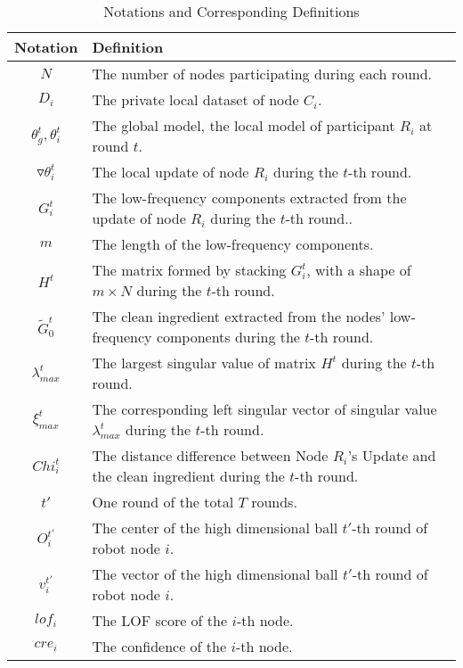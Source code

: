 \documentclass[lettersize,journal]{IEEEtran}
\begin{document}
\begin{table*}[h]
\centering
\caption{Notations and Corresponding Definitions}
\label{tabl:notations}
\begin{tabular}{|c|l|}
\hline
\textbf{Notation} & \textbf{Definition} \\ \hline
$ N $ & The number of nodes participating during each round. \\ \hline
$D_i$ & The private local dataset of node $C_i$. \\ \hline

$\theta_g^t, \theta_i^t$ & The global model, the local model of participant $R_i$ at round $t$. \\ \hline
$\triangledown \theta_i^t$ & The local update of node $R_i$ during the $t$-th round. \\ \hline
$G_i^t $ & The low-frequency components extracted from the update of node $R_i$ during the $t$-th round.. \\ \hline
$m$ & The length of the low-frequency components. \\ \hline
$H^t$ & The matrix formed by stacking $G_i^t$, with a shape of $m \times N$ during the $t$-th round. \\ \hline
$\tilde{G}_{0}^t $ & The clean ingredient extracted from the nodes' low-frequency components during the $t$-th round. \\ \hline
$\lambda_{max}^t$ & The largest singular value of matrix $H^t$ during the $t$-th round. \\ \hline
$\xi_{max}^t$ & The corresponding left singular vector of singular value $\lambda_{max}^t$ during the $t$-th round. \\ \hline
$Chi_i^t$ & The distance difference between Node $R_i$'s Update and the clean ingredient during the $t$-th round. \\ \hline
$t'$ & One round of the total $T$ rounds. \\ \hline
$O_i^{t'}$ &  The center of the high dimensional ball $t'$-th round of robot node $i$. \\ \hline
\( {v}_{i}^{t'} \) & The vector of the high dimensional ball $t'$-th round of robot node $i$.\\ \hline
$lof_i$ & The LOF score of the $i$-th node.\\ \hline
$cre_i$ & The confidence of the $i$-th node.\\ \hline


\end{tabular}
\end{table*}
\end{document}
